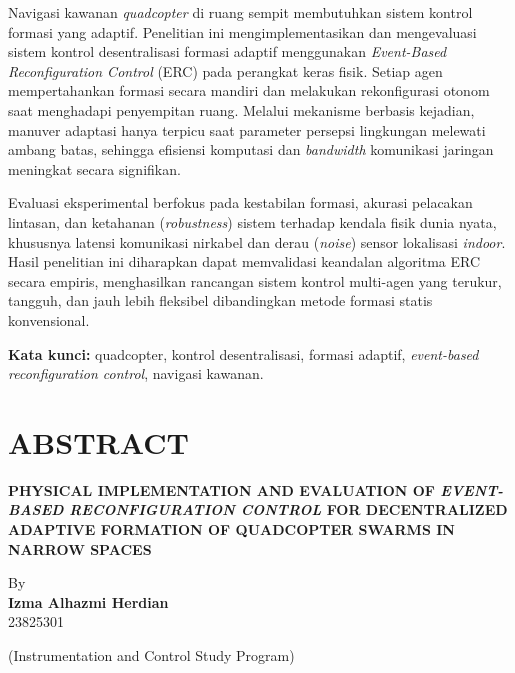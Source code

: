 \documentclass[12pt,a4paper]{report}
\numberwithin{equation}{chapter}
\begin{document}
\vspace{0.8cm}

\noindent
Navigasi kawanan \textit{quadcopter} di ruang sempit membutuhkan sistem kontrol formasi yang adaptif. Penelitian ini mengimplementasikan dan mengevaluasi sistem kontrol desentralisasi formasi adaptif menggunakan \textit{Event-Based Reconfiguration Control} (ERC\label{abbr:erc}) pada perangkat keras fisik. Setiap agen mempertahankan formasi secara mandiri dan melakukan rekonfigurasi otonom saat menghadapi penyempitan ruang. Melalui mekanisme berbasis kejadian, manuver adaptasi hanya terpicu saat parameter persepsi lingkungan melewati ambang batas, sehingga efisiensi komputasi dan \textit{bandwidth} komunikasi jaringan meningkat secara signifikan.

\noindent
Evaluasi eksperimental berfokus pada kestabilan formasi, akurasi pelacakan lintasan, dan ketahanan (\textit{robustness}) sistem terhadap kendala fisik dunia nyata, khususnya latensi komunikasi nirkabel dan derau (\textit{noise}) sensor lokalisasi \textit{indoor}. Hasil penelitian ini diharapkan dapat memvalidasi keandalan algoritma ERC secara empiris, menghasilkan rancangan sistem kontrol multi-agen yang terukur, tangguh, dan jauh lebih fleksibel dibandingkan metode formasi statis konvensional.

\vspace{1cm}
\noindent \textbf{Kata kunci:} quadcopter, kontrol desentralisasi, formasi adaptif, \textit{event-based reconfiguration control}, navigasi kawanan.

\chapter*{ABSTRACT}

\begin{center}
    \textbf{PHYSICAL IMPLEMENTATION AND EVALUATION OF \textit{EVENT-BASED RECONFIGURATION CONTROL} FOR DECENTRALIZED ADAPTIVE FORMATION OF QUADCOPTER SWARMS IN NARROW SPACES}

    \vspace{0.8cm}
    By\\
    \textbf{Izma Alhazmi Herdian}\\
    23825301

    \vspace{0.8cm}
    (Instrumentation and Control Study Program)
\end{center}
\end{document}
